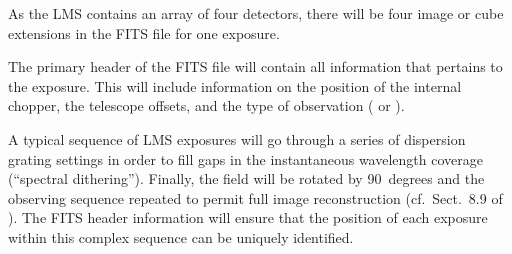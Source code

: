 As the LMS contains an array of four detectors, there will be four
image or cube extensions in the FITS file for one exposure.

The primary header of the FITS file will contain all information that
pertains to the exposure. This will include information on the
position of the internal chopper, the telescope offsets, and the type
of observation ( or ).

A typical sequence of LMS exposures will go through a series of
dispersion grating settings in order to fill gaps in the instantaneous
wavelength coverage (``spectral dithering''). Finally, the field will be
rotated by 90~degrees and the observing sequence repeated to permit
full image reconstruction
(cf.~Sect.~8.9 of \cite{DRLS}). The FITS header
information will ensure that the position of each exposure within this
complex sequence can be uniquely identified.



